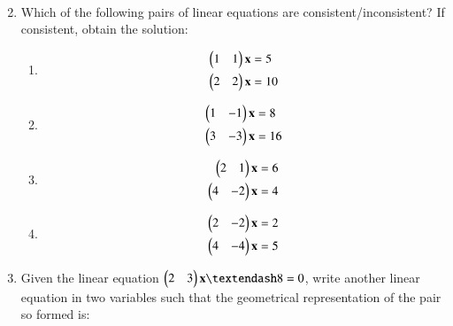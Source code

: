 \begin{enumerate}[label=\arabic*.,ref=\thesubsection.\theenumi]
\begin{enumerate}[itemsep=2pt]
\begin{align}
\end{align}
\end{enumerate}
%
\item Which of the following pairs of linear equations are consistent/inconsistent? If consistent, obtain the solution:
%
\begin{enumerate}[itemsep=2pt]
\item
\begin{align}
\begin{split}
\begin{pmatrix}1 & 1 \end{pmatrix}\mathbf{x}&=5
\\
\begin{pmatrix}2 & 2 \end{pmatrix}\mathbf{x}&=10
\end{split}
\end{align}
\item
\begin{align}
\begin{split}
\begin{pmatrix}1 & -1 \end{pmatrix}\mathbf{x}&=8
\\
\begin{pmatrix}3 & -3 \end{pmatrix}\mathbf{x}&=16
\end{split}
\end{align}
\item
\begin{align}
\begin{split}
\begin{pmatrix}2 & 1 \end{pmatrix}\mathbf{x}&=6
\\
\begin{pmatrix}4 & -2 \end{pmatrix}\mathbf{x}&=4
\end{split}
\end{align}
\item
\begin{align}
\begin{split}
\begin{pmatrix}2 & -2 \end{pmatrix}\mathbf{x}&=2
\\
\begin{pmatrix}4 & -4 \end{pmatrix}\mathbf{x}&=5
\end{split}
\end{align}
\end{enumerate}
%
\item Given the linear equation $\myvec{2 & 3}\vec{x} – 8 = 0$, write another linear equation in two variables such that the geometrical representation of the pair so formed is: 
%
\begin{enumerate}[itemsep=2pt]
\end{enumerate}

\end{enumerate}
